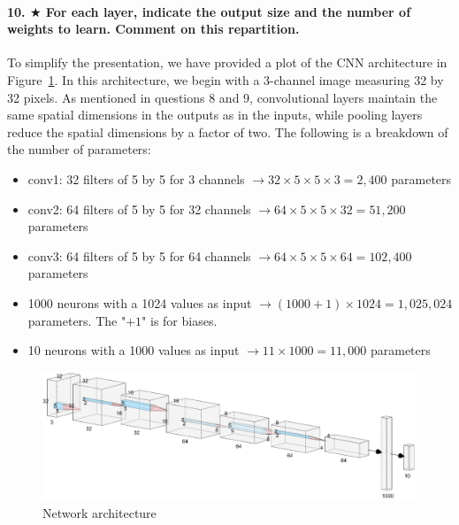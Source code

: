 \documentclass{article}
\theoremstyle{plain}%
\theoremstyle{definition}
\theoremstyle{remark}
\begin{document}
\paragraph{10. $ \bigstar $ For each layer, indicate the output size and the number of weights to learn. Comment on this repartition.}
To simplify the presentation, we have provided a plot of the CNN architecture in Figure~\ref{fig:AlexNetstylelog}. In this architecture, we begin with a 3-channel image measuring 32 by 32 pixels. As mentioned in questions 8 and 9, convolutional layers maintain the same spatial dimensions in the outputs as in the inputs, while pooling layers reduce the spatial dimensions by a factor of two. The following is a breakdown of the number of parameters:
\begin{itemize}
    \item conv1: 32 filters of 5 by 5 for 3 channels $\rightarrow 32\times 5\times 5\times 3 = 2,400$ parameters
    \item conv2: 64 filters of 5 by 5 for 32 channels $\rightarrow 64\times 5\times 5\times 32 = 51,200$ parameters
    \item conv3: 64 filters of 5 by 5 for 64 channels $\rightarrow 64\times 5\times 5\times 64 = 102,400$ parameters
    \item 1000 neurons with a 1024 values as input $\rightarrow (1000 + 1)\times 1024=1,025,024$ parameters. The "$+1$" is for biases.
    \item 10 neurons with a 1000 values as input $\rightarrow 11\times 1000=11,000$ parameters
\end{itemize}
\begin{figure}[H]
    \centering
    \includegraphics*[width=\textwidth]{figs/AlexNet_style_log.png}
    \caption{Network architecture}
    \label{fig:AlexNetstylelog}
\end{figure}
\end{document}
